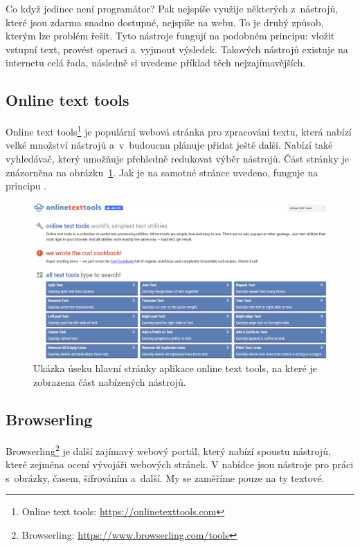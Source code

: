Co když jedinec není programátor? Pak nejspíše využije některých z~nástrojů, které jsou zdarma snadno dostupné, nejspíše na webu. To je druhý způsob, kterým lze problém řešit. Tyto nástroje fungují na podobném principu: vložit vstupní text, provést operaci a~vyjmout výsledek. Takových nástrojů existuje na internetu celá řada, následně si uvedeme příklad těch nejzajímavějších.

\subsection*{Online text tools}
Online text tools\footnote{Online text tools: \url{https://onlinetexttools.com}} je populární webová stránka pro zpracování textu, která nabízí velké množství nástrojů a~v~budoucnu plánuje přidat ještě další. Nabízí také vyhledávač, který umožňuje přehledně redukovat výběr nástrojů. Část stránky je znázorněna na obrázku~\ref{obr:Online text tools}. Jak je na samotné stránce uvedeno, funguje na principu .
\begin{figure}[hbt]
	\centering
	\setlength{\fboxsep}{0pt}
	\includegraphics[width=1\textwidth]{obrazky-figures/onlinetexttools_prehled.png}
	\caption{Ukázka úseku hlavní stránky aplikace online text tools, na které je zobrazena část nabízených nástrojů.}
	\label{obr:Online text tools}
\end{figure}

\subsection*{Browserling}
Browserling\footnote{Browserling: \url{https://www.browserling.com/tools}} je další zajímavý webový portál, který nabízí spoustu nástrojů, které zejména ocení vývojáři webových stránek. V nabídce jsou nástroje pro práci s~obrázky, časem, šifrováním a~další. My se zaměříme pouze na ty textové.

